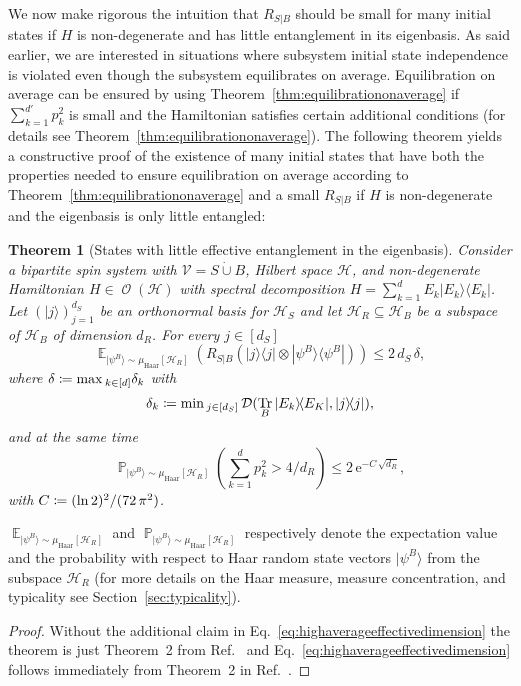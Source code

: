 \documentclass[a4paper,12pt,listof=totoc,index=totoc,bibliography=totoc,headsepline=false,headings=normal,BCOR16.153846mm,DIV12,headinclude,twoside,cleardoublepage=empty,numbers=noenddot,final]{scrreprt}
\theoremstyle{mystyle}
\numberwithin{equation}{section}
\numberwithin{figure}{section}
\numberwithin{lemma}{section}
\newtheorem{theorem}{Theorem}
\numberwithin{theorem}{section}
\numberwithin{corollary}{section}
\numberwithin{definition}{section}
\numberwithin{conjecture}{section}
\numberwithin{observation}{section}
\newcommand{\+}{\mkern2mu}
\newcommand{\coloneqq}{\mathrel{\vcentcolon\mkern-1.2mu=}} %
\newcommand{\dunion}{\mathbin{\dot{\cup}}}
\newcommand{\texteqref}[1]{Eq.~\eqref{#1}}
\renewcommand{\max}{\mathchoice{\operatorname*{max}}{\operatorname*{max}}{\mathrm{max}}{\mathrm{max}}} %
\renewcommand{\min}{\mathchoice{\operatorname*{min}}{\operatorname*{min}}{\mathrm{min}}{\mathrm{min}}}
\renewcommand{\H}{H}
\newcommand{\muhaar}{\mu_{\mathrm{Haar}}}
\newcommand{\Vset}{\mathcal{V}}
\newcommand{\bra}[1]{\langle #1|}
\newcommand{\ket}[1]{|#1\rangle}
\newcommand{\ketbra}[2]{\ket{#1}\!\bra{#2}}
\newcommand{\tracedistance}[3][]{
  \ifthenelse{\equal{#2}{}}
  {\ifthenelse{\equal{#3}{}}
    {\mathcal{D}_{#1}}{}
  }{
    \ifthenelse{\equal{#1}{}}
    {\operatorname{\mathcal{D}}(#2,#3)}
    {\operatorname{\mathcal{D}}_{#1}(#2,#3)}
  }
}
\DeclareMathOperator*{\probability}{\mathbb{P}}
\DeclareMathOperator*{\expectation}{\mathbb{E}}
\newcommand{\e}{\mathrm{e}}
\DeclareMathOperator{\1}{\mathds{1}}
\DeclareMathOperator{\Obs}{\mathcal{O}}
\DeclareMathOperator{\Tr}{Tr}
\newcommand{\mc}[1]{\mathcal{#1}}
\newcommand{\mcH}{\mc{H}}
\begin{document}
We now make rigorous the intuition that $R_{S|B}$ should be small for many initial states if $\H$ is non-degenerate and has little entanglement in its eigenbasis.
As said earlier, we are interested in situations where subsystem initial state independence is violated even though the subsystem equilibrates on average.
Equilibration on average can be ensured by using Theorem~\ref{thm:equilibrationonaverage} if $\sum_{k=1}^{d'} p_k^2$ is small and the Hamiltonian satisfies certain additional conditions (for details see Theorem~\ref{thm:equilibrationonaverage}).
The following theorem yields a constructive proof of the existence of many initial states that have both the properties needed to ensure equilibration on average according to Theorem~\ref{thm:equilibrationonaverage} and a small $R_{S|B}$ if $\H$ is non-degenerate and the eigenbasis is only little entangled:
\begin{theorem}[States with little effective entanglement in the eigenbasis] \label{thm:entanglementintheeigenbasis}
  Consider a bipartite spin system with $\Vset = S \dunion B$, Hilbert space $\mcH$, and non-degenerate Hamiltonian $\H \in \Obs(\mcH)$ with spectral decomposition $\H = \sum_{k=1}^d E_k \ketbra{E_k}{E_k}$.
  Let $(\ket{j})_{j=1}^{d_S}$ be an orthonormal basis for $\mcH_S$ and let $\mcH_R \subseteq \mcH_B$ be a subspace of $\mcH_B$ of dimension $d_R$.
  For every $j \in [d_S]$
  \begin{equation} \label{eq:averageeffectiveentanglementintheeigenbasisbound}
    \expectation_{\ket{\psi^B}\sim\muhaar[\mcH_R]}\left( R_{S|B}( \ketbra{j}{j} \otimes \ketbra{\psi^B}{\psi^B} ) \right) \leq 2\,d_S\,\delta ,
  \end{equation}
  where $\delta \coloneqq \max_{k\in[d]} \delta_k$ with 
  \begin{equation} \label{eq:geometricentanglementdelta}
     \delta_k \coloneqq \min_{j\in [d_S]} \tracedistance{\Tr_B \ketbra{E_k}{E_K}}{\ketbra{j}{j}} ,
  \end{equation}
  and at the same time
  \begin{equation} \label{eq:highaverageeffectivedimension}
    \probability_{\ket{\psi^B}\sim\muhaar[\mcH_R]}\left( \sum_{k=1}^{d} p_k^2 > 4/d_R \right) \leq 2\,\e^{-C\,\sqrt{d_R}} ,
  \end{equation}
  with $C \coloneqq (\ln 2)^2/(72\,\pi^2)$.
\end{theorem}
$\expectation_{\ket{\psi^B}\sim\muhaar[\mcH_R]}$ and $\probability_{\ket{\psi^B}\sim\muhaar[\mcH_R]}$ respectively denote the expectation value and the probability with respect to Haar random state vectors $\ket{\psi^B}$ from the subspace $\mcH_R$ (for more details on the Haar measure, measure concentration, and typicality see Section~\ref{sec:typicality}).
\begin{proof}
  Without the additional claim in \texteqref{eq:highaverageeffectivedimension} the theorem is just Theorem~2 from Ref.~\cite{PhysRevLett.10-6} and \texteqref{eq:highaverageeffectivedimension} follows immediately from Theorem~2 in Ref.~\cite{Linden09}.
\end{proof}
\end{document}
